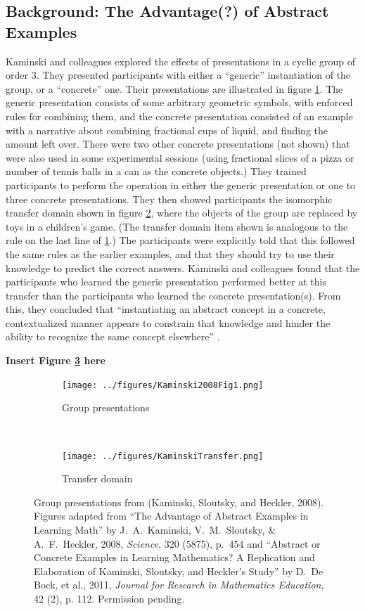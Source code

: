 \documentclass[man,10pt]{apa6}
\begin{document}
\subsection{Background: The Advantage(?) of Abstract Examples}
Kaminski and colleagues \cite{Kaminski2008} explored the effects of presentations in a cyclic group of order 3. They presented participants with either a ``generic'' instantiation of the group, or a ``concrete'' one. Their presentations are illustrated in figure \ref{kaminskitraining}. The generic presentation consists of some arbitrary geometric symbols, with enforced rules for combining them, and the concrete presentation consisted of an example with a narrative about combining fractional cups of liquid, and finding the amount left over. There were two other concrete presentations (not shown) that were also used in some experimental sessions (using fractional slices of a pizza or number of tennis balls in a can as the concrete objects.) They trained participants to perform the operation in either the generic presentation or one to three concrete presentations. They then showed participants the isomorphic transfer domain shown in figure \ref{kaminskitransfer}, where the objects of the group are replaced by toys in a children's game. (The transfer domain item shown is analogous to the rule on the last line of \ref{kaminskitraining}.) The participants were explicitly told that this followed the same rules as the earlier examples, and that they should try to use their knowledge to predict the correct answers. Kaminski and colleagues found that the participants who learned the generic presentation performed better at this transfer than the participants who learned the concrete presentation(s). From this, they concluded that ``instantiating an abstract concept in a concrete, contextualized manner appears to constrain that knowledge and hinder the ability to recognize the same concept elsewhere'' \cite{Kaminski2008}. \par
\begin{center} 
{\bf Insert Figure \ref{kaminskipresentations} here} 
\end{center}
\begin{figure} \centering \begin{subfigure}{0.5\textwidth} \caption{Group presentations} \label{kaminskitraining} \texttt{[image: ../figures/Kaminski2008Fig1.png]} \end{subfigure} \\ \begin{subfigure}{0.5\textwidth} \caption{Transfer domain} \label{kaminskitransfer} \texttt{[image: ../figures/KaminskiTransfer.png]} \end{subfigure} \caption{Group presentations from (Kaminski, Sloutsky, and Heckler, 2008). Figures adapted from ``The Advantage of Abstract Examples in Learning Math'' by J.\ A.\ Kaminski, V.\ M.\ Sloutsky, \& A.\ F.\ Heckler, 2008,  \textit{Science}, 320 (5875), p.\ 454 and ``Abstract or Concrete Examples in Learning Mathematics? A Replication and Elaboration of Kaminski, Sloutsky, and Heckler's Study'' by D.\ De Bock, et al., 2011, \textit{Journal for Research in Mathematics Education}, 42 (2), p. 112.  Permission pending.} 
\label{kaminskipresentations}
\end{figure}
\end{document}
